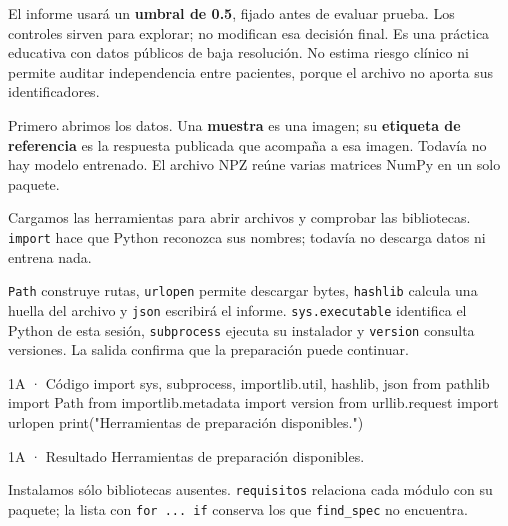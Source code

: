 El informe usará un \textbf{umbral de 0.5}, fijado antes de evaluar prueba. Los controles sirven para explorar; no modifican esa decisión final. Es una práctica educativa con datos públicos de baja resolución. No estima riesgo clínico ni permite auditar independencia entre pacientes, porque el archivo no aporta sus identificadores.


\label{bloque-1}

Primero abrimos los datos. Una \textbf{muestra} es una imagen; su \textbf{etiqueta de referencia} es la respuesta publicada que acompaña a esa imagen. Todavía no hay modelo entrenado. El archivo NPZ reúne varias matrices NumPy en un solo paquete.


\label{paso-1a}

Cargamos las herramientas para abrir archivos y comprobar las bibliotecas. \texttt{\small import} hace que Python reconozca sus nombres; todavía no descarga datos ni entrena nada.

\texttt{\small Path} construye rutas, \texttt{\small urlopen} permite descargar bytes, \texttt{\small hashlib} calcula una huella del archivo y \texttt{\small json} escribirá el informe. \texttt{\small sys.\allowbreak{}executable} identifica el Python de esta sesión, \texttt{\small subprocess} ejecuta su instalador y \texttt{\small version} consulta versiones. La salida confirma que la preparación puede continuar.


\begin{Codigo}{1A · Código}
import sys, subprocess, importlib.util, hashlib, json
from pathlib import Path
from importlib.metadata import version
from urllib.request import urlopen
print("Herramientas de preparación disponibles.")
\end{Codigo}

\begin{Salida}{1A · Resultado}
Herramientas de preparación disponibles.
\end{Salida}

\label{paso-1b}

Instalamos sólo bibliotecas ausentes. \texttt{\small requisitos} relaciona cada módulo con su paquete; la lista con \texttt{\small for .\allowbreak{}.\allowbreak{}.\allowbreak{} if} conserva los que \texttt{\small find\_\allowbreak{}spec} no encuentra.

